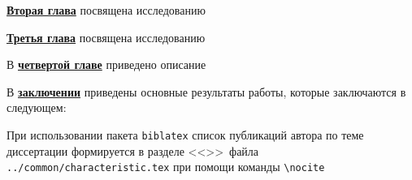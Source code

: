 \underline{\textbf{Вторая глава}} посвящена исследованию 

\underline{\textbf{Третья глава}} посвящена исследованию 

В \underline{\textbf{четвертой главе}} приведено описание 

В \underline{\textbf{заключении}} приведены основные результаты работы, которые заключаются в следующем:



При использовании пакета \verb!biblatex! список публикаций автора по теме
диссертации формируется в разделе <<\publications>>\ файла
\verb!../common/characteristic.tex!  при помощи команды \verb!\nocite! 


